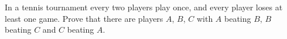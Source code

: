 In a tennis tournament every two players play once, and every player loses at least one game. Prove that there are players $A$, $B$, $C$ with $A$ beating $B$, $B$ beating $C$ and $C$ beating $A$.
